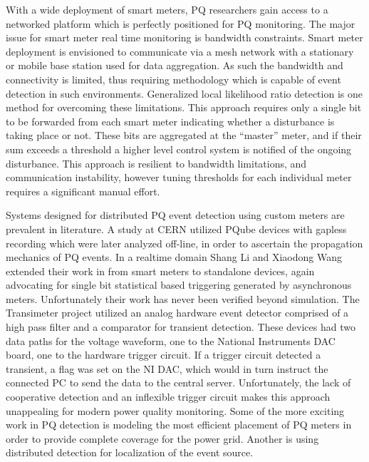 With a wide deployment of smart meters, PQ researchers gain access to a networked platform which is perfectly positioned for PQ monitoring.\cite{hoglund2012using}
The major issue for smart meter real time monitoring is bandwidth constraints.
Smart meter deployment is envisioned to communicate via a mesh network with a stationary or mobile base station used for data aggregation.
As such the bandwidth and connectivity is limited, thus requiring methodology which is capable of event detection in such environments.
Generalized local likelihood ratio detection is one method for overcoming these limitations.
This approach requires only a single bit to be forwarded from each smart meter indicating whether a disturbance is taking place or not.
These bits are aggregated at the ``master'' meter, and if their sum exceeds a threshold a higher level control system is notified of the ongoing disturbance.\cite{li2016cooperative} This approach is resilient to bandwidth limitations, and communication instability, however tuning thresholds for each individual meter requires a significant manual effort.

Systems designed for distributed PQ event detection using custom meters are prevalent in literature.
A study at CERN utilized PQube devices with gapless recording which were later analyzed off-line, in order to ascertain the propagation mechanics of PQ events.\cite{kahle2016power} In a realtime domain Shang Li and Xiaodong Wang extended their work in \cite{li2016cooperative} from smart meters to standalone devices, again advocating for single bit statistical based triggering generated by asynchronous meters.\cite{li2013monitoring} Unfortunately their work has never been verified beyond simulation.
The Transimeter project utilized an analog hardware event detector comprised of a high pass filter and a comparator for transient detection.
These devices had two data paths for the voltage waveform, one to the National Instruments DAC board, one to the hardware trigger circuit.
If a trigger circuit detected a transient, a flag was set on the NI DAC, which would in turn instruct the connected PC to send the data to the central server.\cite{daponte2004transientmeter} Unfortunately, the lack of cooperative detection and an inflexible trigger circuit makes this approach unappealing for modern power quality monitoring.
Some of the more exciting work in PQ detection is modeling the most efficient placement of PQ meters in order to provide complete coverage for the power grid. \cite{won2006new} Another is using distributed detection for localization of the event source.\cite{parsons1998direction} \cite{polajvzer2017evaluation}

